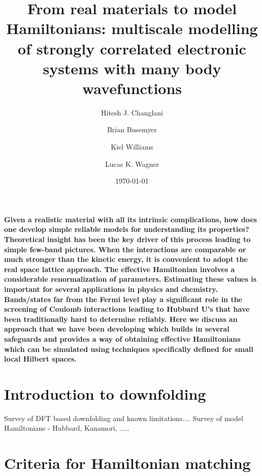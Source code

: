 \documentclass[prl,12pt,onecolumn,nofootinbib,notitlepage,english,superscriptaddress]{revtex4-1}
\begin{document}
\renewcommand{\thefootnote}{\fnsymbol{footnote}}
\renewcommand\abstractname{}
\title{From real materials to model Hamiltonians: multiscale modelling of strongly correlated electronic systems 
       with many body wavefunctions}

\author{Hitesh J. Changlani}
\author{Brian Busemyer}
\author{Kiel Williams}
\author{Lucas K. Wagner}
\date{\today}
\maketitle

\textbf{
Given a realistic material with all its intrinsic complications, how does one develop simple reliable 
models for understanding its properties? Theoretical insight has been the key driver of 
this process leading to simple few-band pictures. When the interactions are comparable or much stronger than 
the kinetic energy, it is convenient to adopt the real space lattice approach. The 
effective Hamiltonian involves a considerable renormalization of parameters. Estimating these values 
is important for several applications in physics and chemistry. Bands/states far from the 
Fermi level play a significant role in the screening of Coulomb interactions leading to Hubbard U's 
that have been traditionally hard to determine reliably. Here we discuss an approach that we 
have been developing which builds in several safeguards and provides a way of obtaining effective Hamiltonians 
which can be simulated using techniques specifically defined for small local Hilbert spaces.
}

\section{Introduction to downfolding}
Survey of DFT based downfolding and known limitations....
Survey of model Hamiltonians - Hubbard, Kanamori, .....

\section{Criteria for Hamiltonian matching}
\end{document}
